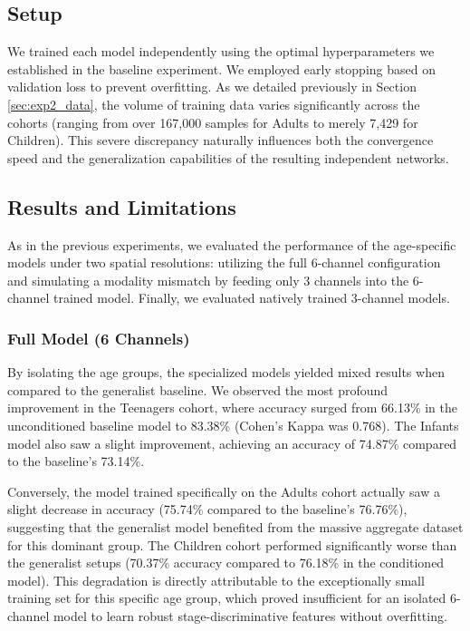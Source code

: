 \subsection{Setup}
We trained each model independently using the optimal hyperparameters we established in the baseline experiment. We employed early stopping based on validation loss to prevent overfitting. As we detailed previously in Section \ref{sec:exp2_data}, the volume of training data varies significantly across the cohorts (ranging from over 167,000 samples for Adults to merely 7,429 for Children). This severe discrepancy naturally influences both the convergence speed and the generalization capabilities of the resulting independent networks.

\subsection{Results and Limitations}
As in the previous experiments, we evaluated the performance of the age-specific models under two spatial resolutions: utilizing the full 6-channel configuration and simulating a modality mismatch by feeding only 3 channels into the 6-channel trained model. Finally, we evaluated natively trained 3-channel models.

\subsubsection*{Full Model (6 Channels)}
By isolating the age groups, the specialized models yielded mixed results when compared to the generalist baseline. We observed the most profound improvement in the Teenagers cohort, where accuracy surged from 66.13\% in the unconditioned baseline model to 83.38\% (Cohen's Kappa was 0.768). The Infants model also saw a slight improvement, achieving an accuracy of 74.87\% compared to the baseline's 73.14\%. 

Conversely, the model trained specifically on the Adults cohort actually saw a slight decrease in accuracy (75.74\% compared to the baseline's 76.76\%), suggesting that the generalist model benefited from the massive aggregate dataset for this dominant group. The Children cohort performed significantly worse than the generalist setups (70.37\% accuracy compared to 76.18\% in the conditioned model). This degradation is directly attributable to the exceptionally small training set for this specific age group, which proved insufficient for an isolated 6-channel model to learn robust stage-discriminative features without overfitting.

